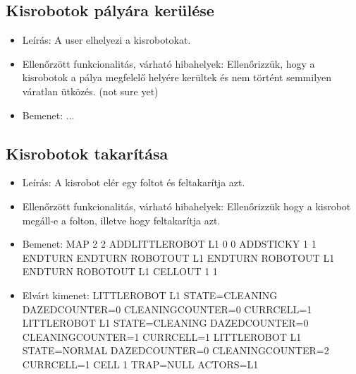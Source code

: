 \subsection{Kisrobotok pályára kerülése}
\begin{itemize}
\item Leírás: \newline
A user elhelyezi a kisrobotokat.
\item Ellenőrzött funkcionalitás, várható hibahelyek: \newline
Ellenőrizzük, hogy a kisrobotok a pálya megfelelő helyére kerültek és nem történt semmilyen váratlan ütközés. (not sure yet)
\item Bemenet: \newline
... \newline
\end{itemize}

\subsection{Kisrobotok takarítása}
\begin{itemize}
	\item Leírás: \newline
	A kisrobot elér egy foltot és feltakarítja azt. \newline
	\item Ellenőrzött funkcionalitás, várható hibahelyek: \newline
	Ellenőrizzük hogy a kisrobot megáll-e a folton, illetve hogy feltakarítja azt. \newline
	\item Bemenet: \newline
	MAP 2 2 \newline
	ADDLITTLEROBOT L1 0 0 \newline
	ADDSTICKY 1 1 \newline
	ENDTURN \newline
	ENDTURN \newline
	ROBOTOUT L1 \newline
	ENDTURN \newline
	ROBOTOUT L1 \newline
	ENDTURN \newline
	ROBOTOUT L1 \newline
	CELLOUT 1 1 \newline
	\item Elvárt kimenet: \newline
	LITTLEROBOT L1 STATE=CLEANING DAZEDCOUNTER=0 CLEANINGCOUNTER=0 CURRCELL=1
	LITTLEROBOT L1 STATE=CLEANING DAZEDCOUNTER=0 CLEANINGCOUNTER=1 CURRCELL=1
	LITTLEROBOT L1 STATE=NORMAL DAZEDCOUNTER=0 CLEANINGCOUNTER=2 CURRCELL=1
	CELL 1 TRAP=NULL ACTORS=L1

\end{itemize}

